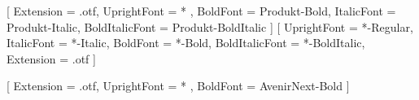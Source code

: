\usepackage{fontspec}



\setmainfont{Produkt-Regular.otf}[
  Extension = .otf,
  UprightFont = * ,
  BoldFont = Produkt-Bold,
  ItalicFont = Produkt-Italic,
  BoldItalicFont = Produkt-BoldItalic
]
\setmainfont{EB Garamond}[    %
  UprightFont      = *-Regular,
  ItalicFont       = *-Italic,
  BoldFont         = *-Bold,
  BoldItalicFont   = *-BoldItalic,
  Extension        = .otf
]

\newfontfamily{}[
  Extension = .otf,
  UprightFont = * ,
  BoldFont = AvenirNext-Bold
]